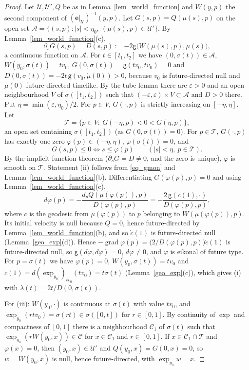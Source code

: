 \documentclass[11pt,a4paper,reqno]{amsart}
\theoremstyle{definition}
\numberwithin{equation}{section}
\newcommand{\cA}{\mathcal{A}}
\newcommand{\cC}{\mathcal{C}}
\newcommand{\cE}{\mathbf{e}}
\newcommand{\cT}{\mathcal{T}}
\newcommand{\cU}{\mathcal{U}}
\newcommand{\sg}{\mathsf{g}}
\newcommand{\grad}{\operatorname{grad}}
\begin{document}
\begin{proof}
Let $\cU,\cU',Q$ be as in Lemma~\ref{lem_world_function} and $W(y,p)$ the second component of $(\cE|_\cU)^{-1}(y,p)$. Let
$G(s,p)=Q(\mu(s),p)$ on the open set $\cA=\{(s,p):|s|<\eta_0,\ (\mu(s),p)\in\cU'\}$. By Lemma~\ref{lem_world_function}(c),
\[
\partial_sG(s,p)=D(s,p):=-2\sg\bigl(W(\mu(s),p),\dot\mu(s)\bigr),
\]
a continuous function on $\cA$. For $t\in[t_1,t_2]$ we have $(0,\sigma(t))\in\cA$, $W(y_0,\sigma(t))=tv_0$,
$G(0,\sigma(t))=\sg(tv_0,tv_0)=0$ and $D(0,\sigma(t))=-2t\,\sg(v_0,\dot\mu(0))>0$, because $v_0$ is future-directed null and
$\dot\mu(0)$ future-directed timelike. By the tube lemma there are $\varepsilon>0$ and an open neighbourhood $V$ of
$\sigma([t_1,t_2])$ such that $(-\varepsilon,\varepsilon)\times V\subset\cA$ and $D>0$ there. Put
$\eta=\min(\varepsilon,\eta_0)/2$. For $p\in V$, $G(\cdot,p)$ is strictly increasing on $[-\eta,\eta]$. Let
\[
\cT=\{p\in V:\ G(-\eta,p)<0<G(\eta,p)\},
\]
an open set containing $\sigma([t_1,t_2])$ (as $G(0,\sigma(t))=0$). For $p\in\cT$, $G(\cdot,p)$ has exactly one zero
$\varphi(p)\in(-\eta,\eta)$, $\varphi(\sigma(t))=0$, and
\begin{equation}\label{eq_gmon}
G(s,p)\le0\iff s\le\varphi(p)\qquad(|s|<\eta,\ p\in\cT).
\end{equation}
By the implicit function theorem ($\partial_sG=D\ne0$, and the zero is unique), $\varphi$ is smooth on $\cT$. Statement (ii)
follows from \eqref{eq_gmon} and Lemma~\ref{lem_world_function}(b). Differentiating $G(\varphi(p),p)=0$ and using
Lemma~\ref{lem_world_function}(c),
\[
d\varphi(p)=-\frac{d_pQ(\mu(\varphi(p)),p)}{D(\varphi(p),p)}=-\frac{2\,\sg(\dot c(1),\cdot)}{D(\varphi(p),p)},
\]
where $c$ is the geodesic from $\mu(\varphi(p))$ to $p$ belonging to $W(\mu(\varphi(p)),p)$. Its initial velocity is null because
$Q=0$, hence future-directed by Lemma~\ref{lem_world_function}(b), and so $\dot c(1)$ is future-directed null
(Lemma~\ref{geo_exp}(d)). Hence $-\grad\varphi(p)=\bigl(2/D(\varphi(p),p)\bigr)\dot c(1)$ is future-directed null, so
$\sg(d\varphi,d\varphi)=0$, $d\varphi\ne0$, and $\varphi$ is eikonal of future type. For $p=\sigma(t)$ we have $\varphi(p)=0$,
$W(y_0,\sigma(t))=tv_0$ and $\dot c(1)=d(\exp_{y_0})_{tv_0}(tv_0)=t\dot\sigma(t)$ (Lemma~\ref{geo_exp}(c)), which gives (i) with
$\lambda(t)=2t/D(0,\sigma(t))$.

For (iii): $W(y_0,\cdot)$ is continuous at $\sigma(t)$ with value $tv_0$, and $\exp_{y_0}(rtv_0)=\sigma(rt)\in\sigma([0,t])$ for
$r\in[0,1]$. By continuity of $\exp$ and compactness of $[0,1]$ there is a neighbourhood $\cC_1$ of $\sigma(t)$ such that
$\exp_{y_0}(rW(y_0,x))\in\cC$ for $x\in\cC_1$ and $r\in[0,1]$. If $x\in\cC_1\cap\cT$ and $\varphi(x)=0$, then $(y_0,x)\in\cU'$
and $Q(y_0,x)=G(0,x)=0$, so $w=W(y_0,x)$ is null, hence future-directed, with $\exp_{y_0}w=x$.
\end{proof}
\end{document}
